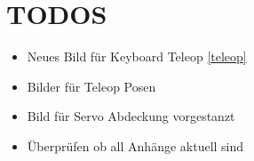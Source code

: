 \section{TODOS}
\begin{itemize}
\item Neues Bild für Keyboard Teleop \ref{teleop}
\item Bilder für Teleop Posen
\item Bild für Servo Abdeckung vorgestanzt
\item Überprüfen ob all Anhänge aktuell sind
\end{itemize}